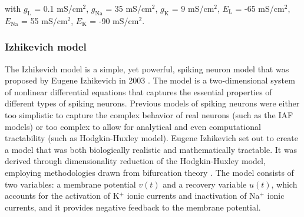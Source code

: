 \documentclass[../main.tex]{subfiles}
\begin{document}
with $g_\text{L}$ = 0.1  mS/cm$^2$, $g_\text{Na}$ = 35 mS/cm$^2$, $g_\text{K}$ = 9 mS/cm$^2$, $E_\text{L}$ = -65  mS/cm$^2$, $E_\text{Na}$ = 55 mS/cm$^2$, $E_\text{K}$ = -90 mS/cm$^2$.
\subsubsection{Izhikevich model}
The Izhikevich model is a simple, yet powerful, spiking neuron model that was proposed by Eugene Izhikevich in 2003 \citep{izhikevich_simple_2003}. 
The model is a two-dimensional system of nonlinear differential equations that captures the essential properties of different types of spiking neurons. 
Previous models of spiking neurons were either too simplistic to capture the complex behavior of real neurons (such as the IAF models) or too complex to allow for analytical and even computational tractability (such as Hodgkin-Huxley model). 
Eugene Izhikevich set out to create a model that was both biologically realistic and mathematically tractable.
It was derived through dimensionality reduction of the Hodgkin-Huxley model, employing methodologies drawn from bifurcation theory \citep{izhikevich_dynamical_2007}.
The model consists of two variables: a membrane potential $v(t)$ and a recovery variable $u(t)$, which accounts for the activation of K$^{+}$ ionic currents and inactivation of Na$^{+}$ ionic currents, and it provides negative feedback to the membrane potential.
\end{document}
